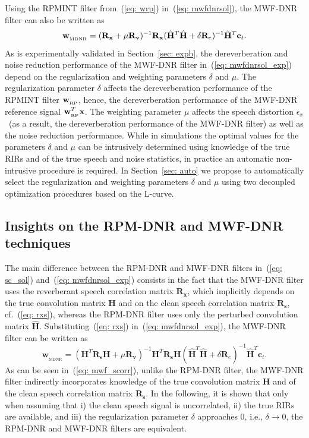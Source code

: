 \documentclass[10pt]{IEEEtran}
\begin{document}
Using the RPMINT filter from~(\ref{eq: wrp}) in~(\ref{eq: mwfdnrsol}), the MWF-DNR filter can also be written as
\begin{equation}
\label{eq: mwfdnrsol_exp}
\mathbf{w}_{_{\rm MDNR}} = (\mathbf{R}_{\mathbf{x}} + \mu \mathbf{R}_{\mathbf{v}})^{-1}\mathbf{R}_{\mathbf{x}}(\hat{\mathbf{H}}^T\hat{\mathbf{H}}+\delta\mathbf{R}_{e})^{-1} \hat{\mathbf{H}}^T\mathbf{c}_t.
\end{equation}
As is experimentally validated in Section~\ref{sec: expb}, the dereverberation and noise reduction performance of the MWF-DNR filter in~(\ref{eq: mwfdnrsol_exp}) depend on the regularization and weighting parameters $\delta$ and $\mu$.
The regularization parameter $\delta$ affects the dereverberation performance of the RPMINT filter $\mathbf{w}_{_{\rm RP}}$, hence, the dereverberation performance of the MWF-DNR reference signal $\mathbf{w}_{_{\rm RP}}^T\mathbf{x}$.
The weighting parameter $\mu$ affects the speech distortion $\epsilon_x$~(as a result, the dereverberation performance of the MWF-DNR filter) as well as the noise reduction performance.
While in simulations the optimal values for the parameters $\delta$ and $\mu$ can be intrusively determined using knowledge of the true RIRs and of the true speech and noise statistics, in practice an automatic non-intrusive procedure is required.
In Section~\ref{sec: auto} we propose to automatically select the regularization and weighting parameters $\delta$ and $\mu$ using two decoupled optimization procedures based on the L-curve.
\subsection{{Insights on the RPM-DNR and MWF-DNR techniques}}
\label{sec: theo}
The main difference between the RPM-DNR and MWF-DNR filters in~(\ref{eq: sc_sol}) and~(\ref{eq: mwfdnrsol_exp}) consists in the fact that the MWF-DNR filter uses the reverberant speech correlation matrix  $\mathbf{R}_{\mathbf{x}}$, which implicitly depends on the true convolution matrix $\mathbf{H}$ and on the clean speech correlation matrix  $\mathbf{R}_{\mathbf{s}}$, cf.~(\ref{eq: rxs}), whereas the RPM-DNR filter uses only the perturbed convolution matrix $\hat{\mathbf{H}}$.
Substituting~(\ref{eq: rxs}) in~(\ref{eq: mwfdnrsol_exp}), the MWF-DNR filter can be written as
\begin{equation}
\label{eq: mwf_scorr}
\mathbf{w}_{_{\text{MDNR}}} = ( \mathbf{H}^T\mathbf{R}_{\mathbf{s}} \mathbf{H} + \mu \mathbf{R}_{\mathbf{v}})^{-1}\mathbf{H}^T \mathbf{R}_{\mathbf{s}}\mathbf{H}(\hat{\mathbf{H}}^T\hat{\mathbf{H}}+\delta\mathbf{R}_{e})^{-1} \hat{\mathbf{H}}^T\mathbf{c}_{t}. 
\end{equation}
As can be seen in~(\ref{eq: mwf_scorr}), unlike the RPM-DNR filter, the MWF-DNR filter indirectly incorporates knowledge of the true convolution matrix $\mathbf{H}$ and of the clean speech correlation matrix $\mathbf{R}_{\mathbf{s}}$.
In the following, it is shown that only when assuming that i) the clean speech signal is uncorrelated, ii) the true RIRs are available, and iii) the regularization parameter $\delta$ approaches $0$, i.e., $\delta \rightarrow 0$, the RPM-DNR and MWF-DNR filters are equivalent.
\end{document}
